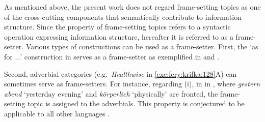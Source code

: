 









As mentioned above, the present work does not regard frame-setting
topics as one of the cross-cutting components that semantically
contribute to information structure.  Since the property of
frame-setting topics refers to a syntactic operation expressing
information structure, hereafter it is referred to as a frame-setter.
Various types of constructions can be used as a frame-setter.  First,
the `as for ...'  construction in  serves as a frame-setter as
exemplified in  and
.




\noindent Second, adverbial categories (e.g.\ \textit{Healthwise} in
\ref{exe:fery:krifka:128}A) can sometimes serve as frame-setters.
For instance, regarding (i), in  in
, where \textit{gestern abend} `yesterday evening' and
\textit{k\"orperlich} `physically' are fronted, the frame-setting
to\-pic is assigned to the adverbials.  This property is conjectured to
be applicable to all other languages \citep{chafe:76,lambrecht:96}.




